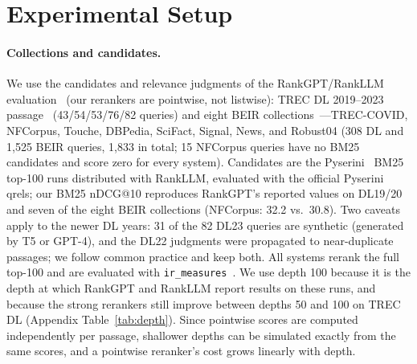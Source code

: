 \section{Experimental Setup}\label{sec:setup}

\paragraph{Collections and candidates.}
We use the candidates and relevance judgments of the RankGPT/RankLLM evaluation~\cite{sun2023rankgpt,rankllm} (our rerankers are pointwise, not listwise): TREC DL 2019--2023 passage~\cite{craswell2020dl19,craswell2021dl20,craswell2022dl21,craswell2023dl22,craswell2024dl23} (43/54/53/76/82 queries) and eight BEIR collections~\cite{thakur2021beir}---TREC-COVID, NFCorpus, Touche, DBPedia, SciFact, Signal, News, and Robust04 (308 DL and 1{,}525 BEIR queries, 1{,}833 in total; 15 NFCorpus queries have no BM25 candidates and score zero for every system).
Candidates are the Pyserini~\cite{pyserini} BM25 top-100 runs distributed with RankLLM, evaluated with the official Pyserini qrels; our BM25 nDCG@10 reproduces RankGPT's reported values on DL19/20 and seven of the eight BEIR collections (NFCorpus: 32.2 vs.\ 30.8).
Two caveats apply to the newer DL years: 31 of the 82 DL23 queries are synthetic (generated by T5 or GPT-4), and the DL22 judgments were propagated to near-duplicate passages; we follow common practice and keep both.
All systems rerank the full top-100 and are evaluated with \texttt{ir\_measures}~\cite{irmeasures}. We use depth 100 because it is the depth at which RankGPT and RankLLM report results on these runs, and because the strong rerankers still improve between depths 50 and 100 on TREC DL (Appendix Table~\ref{tab:depth}). Since pointwise scores are computed independently per passage, shallower depths can be simulated exactly from the same scores, and a pointwise reranker's cost grows linearly with depth.

